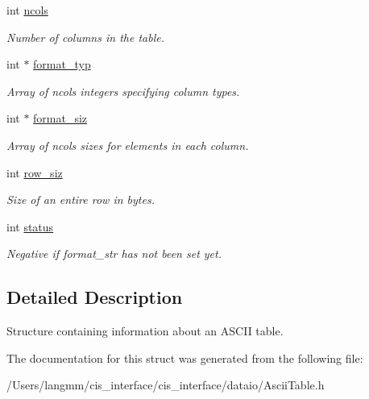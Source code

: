 \begin{DoxyCompactItemize}
int \mbox{\hyperlink{structasciiTable__t_a837095bd2a245987e98f2bdd1fccaa94}{ncols}}
\begin{DoxyCompactList}\small\item\em Number of columns in the table. \end{DoxyCompactList}\item 
\mbox{\label{structasciiTable__t_aaa59065a52a15e3dd33c6e043941ed8b}} 
int $\ast$ \mbox{\hyperlink{structasciiTable__t_aaa59065a52a15e3dd33c6e043941ed8b}{format\+\_\+typ}}
\begin{DoxyCompactList}\small\item\em Array of ncols integers specifying column types. \end{DoxyCompactList}\item 
\mbox{\label{structasciiTable__t_a807c3654eee6e0cedc1d8ce1d3e73b17}} 
int $\ast$ \mbox{\hyperlink{structasciiTable__t_a807c3654eee6e0cedc1d8ce1d3e73b17}{format\+\_\+siz}}
\begin{DoxyCompactList}\small\item\em Array of ncols sizes for elements in each column. \end{DoxyCompactList}\item 
\mbox{\label{structasciiTable__t_aaa2f0c09c59e6b4cdad4e3845552da35}} 
int \mbox{\hyperlink{structasciiTable__t_aaa2f0c09c59e6b4cdad4e3845552da35}{row\+\_\+siz}}
\begin{DoxyCompactList}\small\item\em Size of an entire row in bytes. \end{DoxyCompactList}\item 
\mbox{\label{structasciiTable__t_a3a1b4f901f6cad135a0600a22942c43b}} 
int \mbox{\hyperlink{structasciiTable__t_a3a1b4f901f6cad135a0600a22942c43b}{status}}
\begin{DoxyCompactList}\small\item\em Negative if format\+\_\+str has not been set yet. \end{DoxyCompactList}\end{DoxyCompactItemize}


\subsection{Detailed Description}
Structure containing information about an A\+S\+C\+II table. 

The documentation for this struct was generated from the following file\+:\begin{DoxyCompactItemize}
\item 
/\+Users/langmm/cis\+\_\+interface/cis\+\_\+interface/dataio/Ascii\+Table.\+h\end{DoxyCompactItemize}
